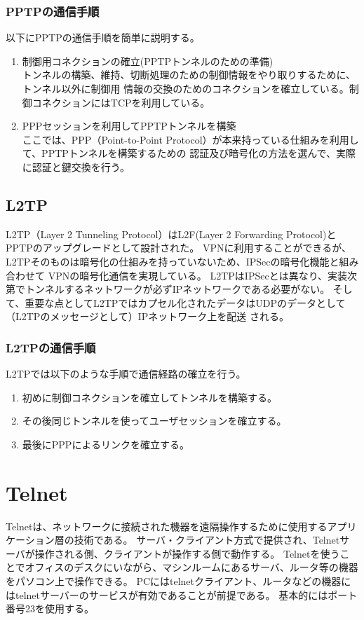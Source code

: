 \documentclass[11pt,a4j,titlepage]{jreport}
\begin{document}
\subsubsection*{PPTPの通信手順}
以下にPPTPの通信手順を簡単に説明する。
\begin{enumerate}
    \item 制御用コネクションの確立(PPTPトンネルのための準備)\mbox{}\\
    トンネルの構築、維持、切断処理のための制御情報をやり取りするために、トンネル以外に制御用
    情報の交換のためのコネクションを確立している。制御コネクションにはTCPを利用している。
    \item PPPセッションを利用してPPTPトンネルを構築\mbox{}\\
    ここでは、PPP（Point-to-Point Protocol）が本来持っている仕組みを利用して、PPTPトンネルを構築するための
    認証及び暗号化の方法を選んで、実際に認証と鍵交換を行う。
\end{enumerate}

\subsection{L2TP}
L2TP（Layer 2 Tunneling Protocol）\cite{RFC2661}はL2F(Layer 2 Forwarding Protocol)とPPTPのアップグレードとして設計された。
VPNに利用することができるが、L2TPそのものは暗号化の仕組みを持っていないため、IPSecの暗号化機能と組み合わせて
VPNの暗号化通信を実現している。
L2TPはIPSecとは異なり、実装次第でトンネルするネットワークが必ずIPネットワークである必要がない。
そして、重要な点としてL2TPではカプセル化されたデータはUDPのデータとして（L2TPのメッセージとして）IPネットワーク上を配送
される。
\subsubsection*{L2TPの通信手順}
L2TPでは以下のような手順で通信経路の確立を行う。
\begin{enumerate}
    \item 初めに制御コネクションを確立してトンネルを構築する。
    \item その後同じトンネルを使ってユーザセッションを確立する。
    \item 最後にPPPによるリンクを確立する。
\end{enumerate}


\section{Telnet}
Telnetは、ネットワークに接続された機器を遠隔操作するために使用するアプリケーション層の技術である。
サーバ・クライアント方式で提供され、Telnetサーバが操作される側、クライアントが操作する側で動作する。
Telnetを使うことでオフィスのデスクにいながら、マシンルームにあるサーバ、ルータ等の機器をパソコン上で操作できる。
PCにはtelnetクライアント、ルータなどの機器にはtelnetサーバーのサービスが有効であることが前提である。
基本的にはポート番号23を使用する。
\end{document}
